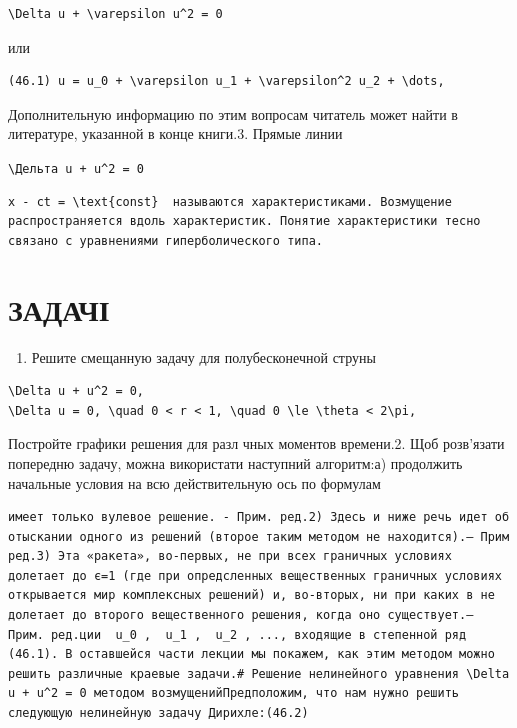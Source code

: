 \documentclass[
  ukrainian,
]{article}
\providecommand{\tightlist}{%
  \setlength{\itemsep}{0pt}\setlength{\parskip}{0pt}}
\begin{document}
\begin{verbatim}
\Delta u + \varepsilon u^2 = 0
\end{verbatim}

или

\begin{verbatim}
(46.1) u = u_0 + \varepsilon u_1 + \varepsilon^2 u_2 + \dots,
\end{verbatim}

Дополнительную информацию по этим вопросам читатель может найти в
литературе, указанной в конце книги.3. Прямые линии

\texttt{\textbackslash{}Дельта\ u\ +\ u\^{}2\ =\ 0}

\begin{verbatim}
x - ct = \text{const}  называются характеристиками. Возмущение распространяется вдоль характеристик. Понятие характеристики тесно связано с уравнениями гиперболического типа.
\end{verbatim}

\section{ЗАДАЧІ}\label{ux437ux430ux434ux430ux447ux456}

\begin{enumerate}
\def\labelenumi{\arabic{enumi}.}
\tightlist
\item
  Решите смещанную задачу для полубесконечной струны
\end{enumerate}

\begin{verbatim}
\Delta u + u^2 = 0,
\Delta u = 0, \quad 0 < r < 1, \quad 0 \le \theta < 2\pi,
\end{verbatim}

Постройте графики решения для разл чных моментов времени.2. Щоб
розв'язати попередню задачу, можна використати наступний алгоритм:а)
продолжить начальные условия на всю действительную ось по формулам

\begin{verbatim}
имеет только вулевое решение. - Прим. ред.2) Здесь и ниже речь идет об отыскании одного из решений (второе таким методом не находится).— Прим ред.3) Эта «ракета», во-первых, не при всех граничных условиях долетает до є=1 (где при опредсленных вещественных граничных условиях открывается мир комплексных решений) и, во-вторых, ни при каких в не долетает до второго вещественного решения, когда оно существует.— Прим. ред.ции  u_0 ,  u_1 ,  u_2 , ..., входящие в степенной ряд (46.1). В оставшейся части лекции мы покажем, как этим методом можно решить различные краевые задачи.# Решение нелинейного уравнения \Delta u + u^2 = 0 методом возмущенийПредположим, что нам нужно решить следующую нелинейную задачу Дирихле:(46.2)
\end{verbatim}
\end{document}
